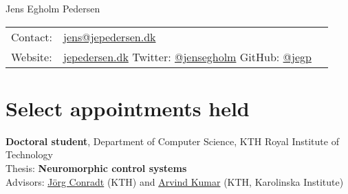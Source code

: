 \documentclass[11pt, a4paper]{article}
\newcommand{\years}[1]{\marginnote{\scriptsize #1}}
\begin{document}
{\LARGE Jens Egholm Pedersen}\\[.6cm]
\begin{tabular}{@{}l l l}
   Contact: & \href{mailto:jens@jepedersen.dk}{jens@jepedersen.dk} \\
   Website: & \href{https://jepedersen.dk}{jepedersen.dk}\hspace{1.6cm}
   Twitter: \href{https://twitter.com/jensegholm}{@jensegholm}\hspace{1.6cm}
   GitHub: \href{https://github.com/jegp/}{@jegp}
\end{tabular}


\section*{Select appointments held}
\years{2019-}\textbf{Doctoral student}, Department of Computer Science, 
KTH Royal Institute of Technology\\
Thesis: \textbf{Neuromorphic control systems}\\
Advisors: 
   \href{https://www.kth.se/profile/conr}{Jörg Conradt} (KTH) and 
   \href{https://www.kth.se/profile/arvindku}{Arvind Kumar} (KTH, Karolinska Institute)

\begin{comment}
\noindent
\years{2019-}\textbf{Doctoral student}, KTH Royal Institute of Technology,
Stockholm, Sweden.\\
Following the title of my thesis ``Neuromorphic control systems'', I work with
sparse, event-driven, and massively parallel brain-inspired algorithms to 
understand and construct goal-oriented and autonomous control systems.\\
\textit{Advisors}: \href{https://www.kth.se/profile/conr}{Jörg Conradt} and 
\href{https://www.kth.se/profile/arvindku}{Arvind Kumar}.
\\
\end{comment}
\end{document}
